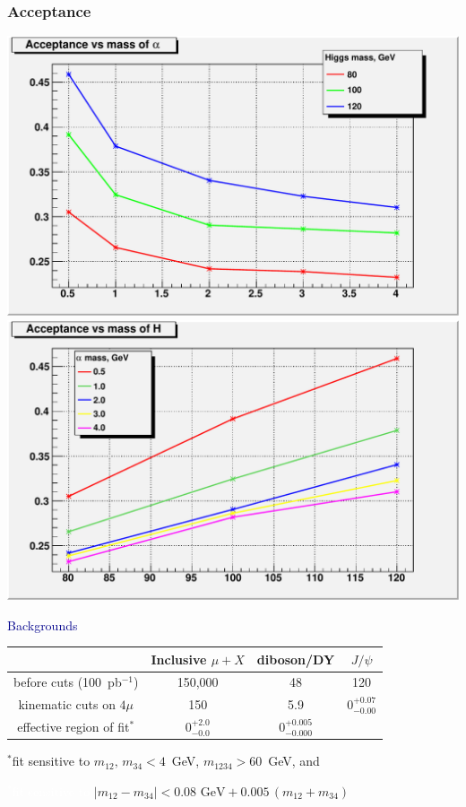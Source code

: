 \documentclass[compress]{beamer}
\begin{document}
\begin{frame}
\frametitle{Acceptance}

\includegraphics[width=0.5\linewidth]{acceptance_a.pdf}
\includegraphics[width=0.5\linewidth]{acceptance_H.pdf}

\vspace{0.5 cm}
\hspace{-0.83 cm} \textcolor{darkblue}{\Large Backgrounds}

\vspace{-0.25 cm}
\renewcommand{\arraystretch}{1.5}
\begin{tabular}{c c c c}
& Inclusive $\mu + X$ & \mbox{\hspace{0.25 cm}}diboson/DY\mbox{\hspace{0.25 cm}} & \mbox{\hspace{0.25 cm}}$J/\psi$\mbox{\hspace{0.25 cm}} \\\hline
before cuts (100~pb$^{-1}$) & 150,000 & 48 & 120 \\
kinematic cuts on $4\mu$ & 150 & 5.9 & $0^{+0.07}_{-0.00}$ \\
effective region of fit$^*$ & $0^{+2.0}_{-0.0}$ & $0^{+0.005}_{-0.000}$ & \\
\end{tabular}

\vfill
$^*$fit sensitive to $m_{12}\mbox{, }m_{34} < 4$~GeV, $m_{1234} > 60$~GeV, and

\vspace{0.1 cm}
\textcolor{white}{$^*$fit sensitive to} $|m_{12} - m_{34}| < 0.08\mbox{ GeV} + 0.005 \, (m_{12} + m_{34})$
\end{frame}
\end{document}
